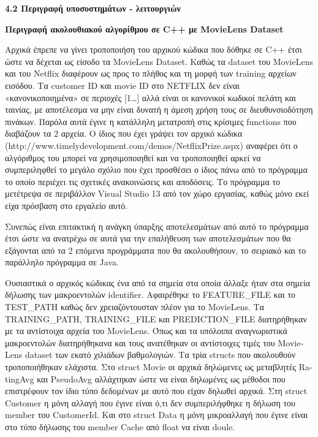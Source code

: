 \documentclass{report}
\begin{document}
\vspace{20mm} 

\textbf{\large{4.2 Περιγραφή υποσυστημάτων - λειτουργιών}}

\vspace{4mm} 

\textbf{Περιγραφή ακολουθιακού αλγορίθμου σε \textlatin{C++} με \textlatin{MovieLens Dataset} }

\vspace{2mm}

Αρχικά έπρεπε να γίνει τροποποιήση του αρχικού κώδικα που δόθηκε σε \textlatin{C++} έτσι ώστε να δέχεται ως είσοδο τα \textlatin{MovieLens Dataset}. Καθώς τα \textlatin{dataset} του \textlatin{MovieLens} και του \textlatin{Netflix} διαφέρουν ως προς το πλήθος και τη μορφή των \textlatin{training} αρχείων εισόδου. Τα \textlatin{customer} \textlatin{ID} και \textlatin{movie ID} στο \textlatin{NETFLIX} δεν είναι «κανονικοποιημένα» σε περιοχές [1…] αλλά είναι οι κανονικοί κωδικοί πελάτη και ταινίας, με αποτέλεσμα να μην είναι δυνατή η άμεση χρήση τους σε διευθυνσιοδότηση πινάκων. Παρόλα αυτά έγινε η κατάλληλη μετατροπή στις κρίσιμες \textlatin{functions} που διαβάζουν τα 2 αρχεία. Ο ίδιος που έχει γράψει τον αρχικό κώδικα (\textlatin{http://www.timelydevelopment.com/demos/NetflixPrize.aspx}) αναφέρει ότι ο αλγόριθμος του μπορεί να χρησιμοποιηθεί και να τροποποιηθεί αρκεί να συμπεριληφθεί το μεγάλο σχόλιο που έχει προσθέσει ο ίδιος πάνω από το πρόγραμμα το οποίο περιέχει τις σχετικές ανακοινώσεις και αποδόσεις. Το πρόγραμμα το μετέτρεψα σε περιβάλλον \textlatin{Visual Studio} 13 από τον χώρο εργασίας, καθώς μόνο εκεί είχα πρόσβαση στο εργαλείο αυτό.

Συνεπώς είναι επιτακτική η ανάγκη ύπαρξης αποτελεσμάτων από αυτό το πρόγραμμα έτσι ώστε να ανατρέχω σε αυτά για την επαλήθευση των αποτελεσμάτων που θα εξάγονται από τα 2 επόμενα προγράμματα που θα ακολουθήσουν, το σειριακό και το παράλληλο  πρόγραμμα σε \textlatin{Java}.  

Ουσιαστικά ο αρχικός κώδικας ένα από τα σημεία στα οποία άλλαξε ήταν στα σημεία δήλωσης των μακροεντολών \textlatin{identifier}. Αφαιρέθηκε το \textlatin{FEATURE\_FILE} και το \textlatin{TEST\_PATH} καθώς δεν χρειαζόντουσταν πλέον για το \textlatin{MovieLens}. Τα \textlatin{TRAINING\_PATH, TRAINING\_FILE και PREDICTION\_FILE} διατηρήθηκαν με τα αντίστοιχα αρχεία του \textlatin{MovieLens}. Όπως και τα υπόλοιπα αναγνωριστικά μακροεντολών διατηρήθηκανα και τους ανατέθηκαν οι αντίστοιχες τιμές του \textlatin{MovieLens dataset} των εκατό χιλιάδων βαθμολογιών. Τα τρία \textlatin{structs} που ακολουθούν τροποποιήθηκαν ελάχιστα. Στο \textlatin{struct Movie} οι αρχικά δηλώμενες ως μεταβλητές \textlatin{RatingAvg} και \textlatin{PseudoAvg} αλλάχτηκαν ώστε να είναι δηλωμένες ως μέθοδοι που επιστρέφουν τον ίδιο τύπο δεδομένων με αυτό που είχαν δηλωθεί αρχικά. Στη \textlatin{struct Customer} η μόνη αλλαγή που έγινε είναι ό,τι δεν συμπεριλήφθηκε η δήλωση του \textlatin{member} του \textlatin{CustomerId}. Και στο \textlatin{struct Data} η μόνη μικροαλλαγή που έγινε είναι στο τύπο δήλωσης του \textlatin{member Cache} από \textlatin{float} να είναι \textlatin{doule}. 
\end{document}
